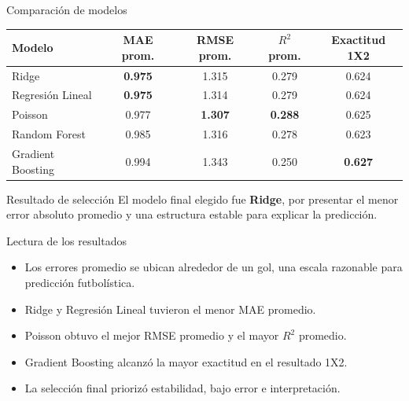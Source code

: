 \documentclass[aspectratio=169]{beamer}
\begin{document}
\begin{frame}{Comparación de modelos}
\small
\centering
\begin{tabular}{lcccc}
\toprule
Modelo & MAE prom. & RMSE prom. & $R^2$ prom. & Exactitud 1X2 \\
\midrule
Ridge & \textbf{0.975} & 1.315 & 0.279 & 0.624 \\
Regresión Lineal & \textbf{0.975} & 1.314 & 0.279 & 0.624 \\
Poisson & 0.977 & \textbf{1.307} & \textbf{0.288} & 0.625 \\
Random Forest & 0.985 & 1.316 & 0.278 & 0.623 \\
Gradient Boosting & 0.994 & 1.343 & 0.250 & \textbf{0.627} \\
\bottomrule
\end{tabular}

\vspace{0.35cm}
\begin{block}{Resultado de selección}
El modelo final elegido fue \textbf{Ridge}, por presentar el menor error absoluto promedio y una estructura estable para explicar la predicción.
\end{block}
\end{frame}

\begin{frame}{Lectura de los resultados}
\begin{itemize}
    \item Los errores promedio se ubican alrededor de un gol, una escala razonable para predicción futbolística.
    \item Ridge y Regresión Lineal tuvieron el menor MAE promedio.
    \item Poisson obtuvo el mejor RMSE promedio y el mayor $R^2$ promedio.
    \item Gradient Boosting alcanzó la mayor exactitud en el resultado 1X2.
    \item La selección final priorizó estabilidad, bajo error e interpretación.
\end{itemize}
\end{frame}
\end{document}
